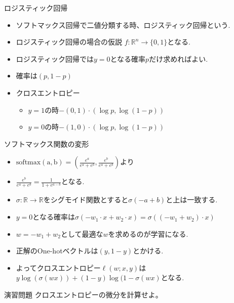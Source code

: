 \begin{frame}{ロジスティック回帰}
\begin{itemize}
\item ソフトマックス回帰で二値分類する時、ロジスティック回帰という.
\item ロジスティック回帰の場合の仮説 $f: \mathbb{R}^n \to  \{0, 1\}$となる.
\item ロジスティック回帰では$y=0$となる確率$p$だけ求めればよい.
  \item 確率は$(p, 1-p)$
  \item クロスエントロピー
  \begin{itemize}
    \item $y=1$の時$ - (0, 1) \cdot (\log p, \log(1-p) )$
    \item $y=0$の時$ - (1, 0) \cdot (\log p, \log(1-p) )$
  \end{itemize}
\end{itemize}
\end{frame}

\begin{frame}{ソフトマックス関数の変形}
\begin{itemize}
 \item $\mathrm{softmax(a,b)} = (\frac{e^a}{e^a + e^b}, \frac{e^b}{e^a + e^b})$より
 \item $\frac{e^b}{e^a + e^b} = \frac{1}{1 + e^{a-b}}$となる.
 \item $\sigma: \mathbb{R} \to \mathbb{R}$をシグモイド関数とすると$\sigma(-a+b)$と上は一致する.
 \item $y=0$となる確率は$ \sigma (-w_1 \cdot x + w_2 \cdot x) = \sigma((-w_1 + w_2) \cdot x)$
 \item $w = - w_1 + w_2$として最適な$w$を求めるのが学習になる.
\item 正解のOne-hotベクトルは$(y, 1-y)$とかける.
\item よってクロスエントロピー$\ell(w; x, y)$は$y \log(\sigma(wx)) + (1-y) \log(1 - \sigma(wx)$となる.
\end{itemize}
\end{frame}

\begin{frame}{演習問題}
クロスエントロピーの微分を計算せよ。

\end{frame}

